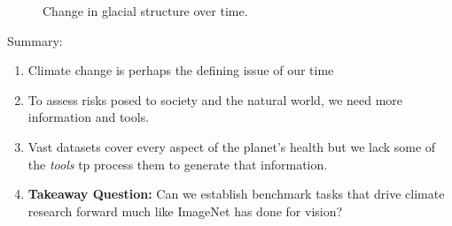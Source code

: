\begin{figure}
    \centering
     \hspace{3mm}
     \hspace{3mm}
     \hspace{3mm}
    \caption{Change in glacial structure over time.}
    \label{fig:glacier}
\end{figure}

Summary:
\begin{enumerate}
    \item Climate change is perhaps the defining issue of our time
    \item To assess risks posed to society and the natural world, we need more information and tools.
    \item Vast datasets cover every aspect of the planet's health but we lack some of the {\it tools} tp process them to generate that information.
    
    \item {\bf Takeaway Question:} Can we establish benchmark tasks that drive climate research forward much like ImageNet has done for vision?
\end{enumerate}

